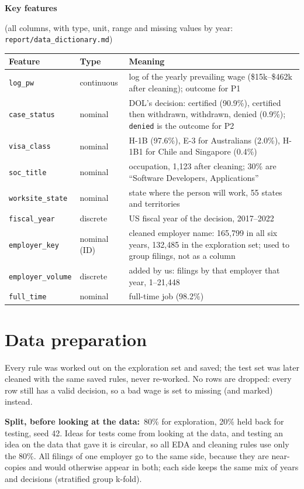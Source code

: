 \documentclass[10pt,a4paper,twocolumn]{article}
\newcommand{\field}[2]{\textbf{#1}~#2\par}
\newcommand{\minihead}[1]{\par\needspace{8\baselineskip}\smallskip\textbf{#1}\par}
\newcommand{\code}[1]{\texttt{#1}}
\begin{document}
\minihead{Key features} (all columns, with type, unit, range and missing values by year: \code{report/data\_dictionary.md})
{\footnotesize
\begin{tabularx}{\linewidth}{@{}L{2.65cm} L{1.5cm} Y@{}}
\toprule
\textbf{Feature} & \textbf{Type} & \textbf{Meaning} \\
\midrule
\code{log\_pw} & continuous & log of the yearly prevailing wage (\$15k--\$462k after cleaning); outcome for P1 \\
\code{case\_status} & nominal & DOL's decision: certified (90.9\%), certified then withdrawn, withdrawn, denied (0.9\%); \code{denied} is the outcome for P2 \\
\code{visa\_class} & nominal & H-1B (97.6\%), E-3 for Australians (2.0\%), H-1B1 for Chile and Singapore (0.4\%) \\
\code{soc\_title} & nominal & occupation, 1{,}123 after cleaning; 30\% are ``Software Developers, Applications'' \\
\code{worksite\_state} & nominal & state where the person will work, 55 states and territories \\
\code{fiscal\_year} & discrete & US fiscal year of the decision, 2017--2022 \\
\code{employer\_key} & nominal (ID) & cleaned employer name: 165{,}799 in all six years, 132{,}485 in the exploration set; used to group filings, not as a column \\
\code{employer\_volume} & discrete & added by us: filings by that employer that year, 1--21{,}448 \\
\code{full\_time} & nominal & full-time job (98.2\%) \\
\bottomrule
\end{tabularx}}

\section{Data preparation}
Every rule was worked out on the exploration set and saved; the test set was later cleaned with
the same saved rules, never re-worked. No rows are dropped: every row still has a valid decision,
so a bad wage is set to missing (and marked) instead.

\field{Split, before looking at the data:}{80\% for exploration, 20\% held back for testing, seed
42. Ideas for tests come from looking at the data, and testing an idea on the data that gave it is
circular, so all EDA and cleaning rules use only the 80\%. All filings of one employer go to the
same side, because they are near-copies and would otherwise appear in both; each side keeps the
same mix of years and decisions (stratified group k-fold).}
\end{document}
